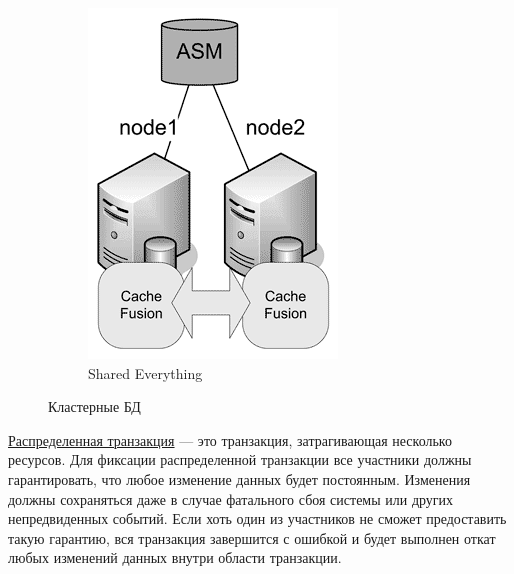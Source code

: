\begin{figure}[h]
\begin{subfigure}[b]{0.2\textwidth}
		\includegraphics[width=\textwidth]{7/07_04.png}
		\caption{Shared Everything}
	\end{subfigure}
	
	\caption{Кластерные БД}
\end{figure}


\bigskip
\href{https://en.wikipedia.org/wiki/Distributed_transaction}{Распределенная транзакция} — это транзакция, затрагивающая несколько ресурсов. Для фиксации распределенной транзакции все участники должны гарантировать, что любое изменение данных будет постоянным. Изменения должны сохраняться даже в случае фатального сбоя системы или других непредвиденных событий. Если хоть один из участников не сможет предоставить такую гарантию, вся транзакция завершится с ошибкой и будет выполнен откат любых изменений данных внутри области транзакции.